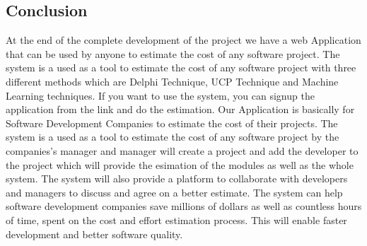 \subsection{Conclusion}
At the end of the complete development of the project we have a web Application that can be used by
anyone to estimate the cost of any software project. The system is a used as a tool to estimate the
cost of any software project with three different methods which are Delphi Technique, UCP Technique and
Machine Learning techniques. If you want to use the system, you can signup the application from the
link and do the estimation.
Our Application is basically for Software Development Companies to estimate the cost of their projects.
The system is a used as a tool to estimate the cost of any software project by the companies's manager and manager
will create a project and add the developer to the project which will provide the esimation of the modules as well as
the whole system. The system will also provide a platform to collaborate with developers and managers to discuss and agree on a better estimate.
The system can help software development companies save millions of dollars as well as countless hours of time, spent on the cost and effort estimation process.
This will enable faster development and better software quality.
